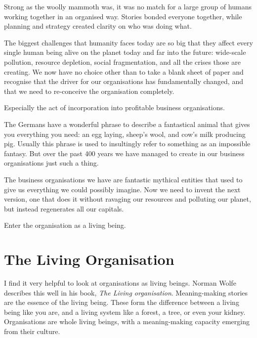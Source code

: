 Strong as the woolly mammoth was, it was no match for a large group of humans working together in an organised way. Stories bonded everyone together, while planning and strategy created clarity on who was doing what. 


The biggest challenges that humanity faces today are so big that they affect every single human being alive on the planet today and far into the future: wide-scale pollution, resource depletion, social fragmentation, and all the crises those are creating. We now have no choice other than to take a blank sheet of paper and recognise that the driver for our organisations has fundamentally changed, and that we need to re-conceive the organisation completely.


Especially the act of incorporation into profitable business organisations.


The Germans have a wonderful phrase to describe a fantastical animal that gives you everything you need: an egg laying, sheep's wool, and cow's milk producing pig. Usually this phrase is used to insultingly refer to something as an impossible fantasy. But over the past 400 years we have managed to create in our business organisations just such a thing.


The business organisations we have are fantastic mythical entities that used to give us everything we could possibly imagine. Now we need to invent the next version, one that does it without ravaging our resources and polluting our planet, but instead regenerates all our capitals. 


Enter the organisation as a living being.


\section{The Living Organisation}
\label{section:living-organisation}


I find it very helpful to look at organisations as living beings. Norman Wolfe describes this well in his book, \emph{The Living organisation}\cite{wolfe-tlo}. Meaning\hyp{}making stories are the essence of the living being. These form the difference between a living being like you are, and a living system like a forest, a tree, or even your kidney. Organisations are whole living beings, with a meaning\hyp{}making capacity emerging from their culture.


